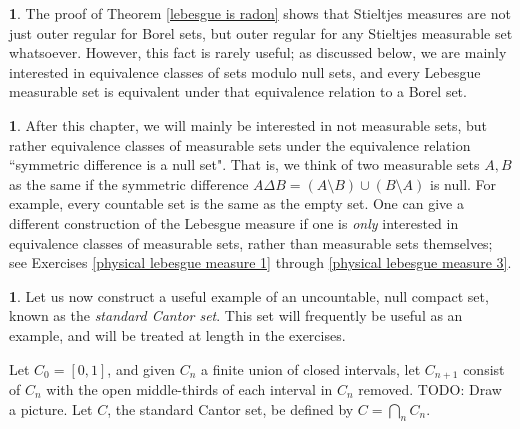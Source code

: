 \documentclass[12pt]{book}
\newcommand{\dfn}[1]{\emph{#1}\index{#1}}
\theoremstyle{definition}
\newtheorem{subsec}[theorem]{}
\begin{document}
\begin{subsec}
The proof of Theorem \ref{lebesgue is radon} shows that Stieltjes measures are not just outer regular for Borel sets, but outer regular for any Stieltjes measurable set whatsoever.
However, this fact is rarely useful; as discussed below, we are mainly interested in equivalence classes of sets modulo null sets, and every Lebesgue measurable set is equivalent under that equivalence relation to a Borel set.
\end{subsec}

\begin{subsec}
After this chapter, we will mainly be interested in not measurable sets, but rather equivalence classes of measurable sets under the equivalence relation ``symmetric difference is a null set".
That is, we think of two measurable sets $A,B$ as the same if the symmetric difference $A \Delta B = (A \setminus B) \cup (B \setminus A)$ is null.
For example, every countable set is the same as the empty set.
One can give a different construction of the Lebesgue measure if one is \emph{only} interested in equivalence classes of measurable sets, rather than measurable sets themselves; see Exercises \ref{physical lebesgue measure 1} through \ref{physical lebesgue measure 3}.
\end{subsec}

\begin{subsec}
Let us now construct a useful example of an uncountable, null compact set, known as the \dfn{standard Cantor set}.
This set will frequently be useful as an example, and will be treated at length in the exercises.

Let $C_0 = [0, 1]$, and given $C_n$ a finite union of closed intervals, let $C_{n+1}$ consist of $C_n$ with the open middle-thirds of each interval in $C_n$ removed. TODO: Draw a picture.
Let $C$, the standard Cantor set, be defined by $C = \bigcap_n C_n$.
\end{subsec}
\end{document}
